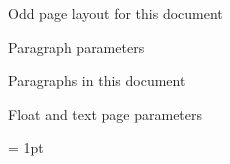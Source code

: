 \documentclass[]{article}
\begin{document}
\layout



\begin{figure}
	\currentpage
	\oddpagelayouttrue
	\pagedesign
	\caption{Odd page layout for this document} \label{fig:ptrs}
\end{figure}



\begin{figure}
	\paragraphdiagram
	\caption{Paragraph parameters}\label{fig:fpara}
\end{figure}



\currentparagraph
\begin{figure}
	\paragraphdesign
	\caption{Paragraphs in this document}\label{fig:dpara}
\end{figure}




\begin{figure}
	\floatpagediagram
	\caption{Float and text page parameters}\label{fig:fpp}
\end{figure}


\begin{figure}
\printparameterstrue
\unitlength = 1pt 
\end{figure}
\end{document}
